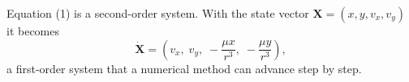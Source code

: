 Equation (1) is a second-order system.
With the state vector $\mathbf X = (x, y, v_x, v_y)$ it becomes
\begin{equation}
  \dot{\mathbf X} = \left(v_x,\; v_y,\; -\frac{\mu x}{r^3},\; -\frac{\mu y}{r^3}\right),
\end{equation}
a first-order system that a numerical method can advance step by step.
